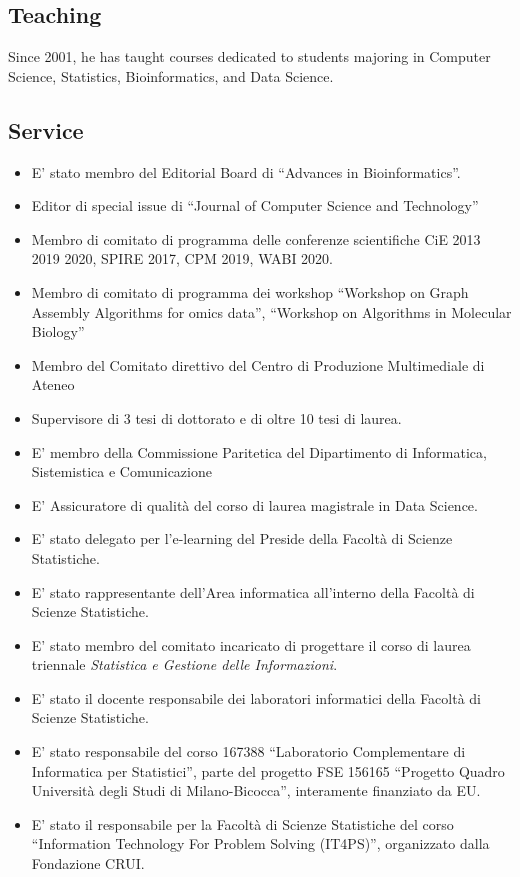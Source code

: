\documentclass[
]{article}
\providecommand{\tightlist}{%
  \setlength{\itemsep}{0pt}\setlength{\parskip}{0pt}}
\begin{document}
\hypertarget{teaching}{%
\subsection{Teaching}\label{teaching}}

Since 2001, he has taught courses dedicated to students majoring in
Computer Science, Statistics, Bioinformatics, and Data Science.

\hypertarget{service}{%
\subsection{Service}\label{service}}

\begin{itemize}
\tightlist
\item
  E' stato membro del Editorial Board di ``Advances in Bioinformatics''.
\item
  Editor di special issue di ``Journal of Computer Science and
  Technology''
\item
  Membro di comitato di programma delle conferenze scientifiche CiE 2013
  2019 2020, SPIRE 2017, CPM 2019, WABI 2020.
\item
  Membro di comitato di programma dei workshop ``Workshop on Graph
  Assembly Algorithms for omics data'', ``Workshop on Algorithms in
  Molecular Biology''
\item
  Membro del Comitato direttivo del Centro di Produzione Multimediale di
  Ateneo
\item
  Supervisore di 3 tesi di dottorato e di oltre 10 tesi di laurea.
\item
  E' membro della Commissione Paritetica del Dipartimento di
  Informatica, Sistemistica e Comunicazione
\item
  E' Assicuratore di qualità del corso di laurea magistrale in Data
  Science.
\item
  E' stato delegato per l'e-learning del Preside della Facoltà di
  Scienze Statistiche.
\item
  E' stato rappresentante dell'Area informatica all'interno della
  Facoltà di Scienze Statistiche.
\item
  E' stato membro del comitato incaricato di progettare il corso di
  laurea triennale \emph{Statistica e Gestione delle Informazioni}.
\item
  E' stato il docente responsabile dei laboratori informatici della
  Facoltà di Scienze Statistiche.
\item
  E' stato responsabile del corso 167388 ``Laboratorio Complementare di
  Informatica per Statistici'', parte del progetto FSE 156165 ``Progetto
  Quadro Università degli Studi di Milano-Bicocca'', interamente
  finanziato da EU.
\item
  E' stato il responsabile per la Facoltà di Scienze Statistiche del
  corso ``Information Technology For Problem Solving (IT4PS)'',
  organizzato dalla Fondazione CRUI.
\end{itemize}
\end{document}
